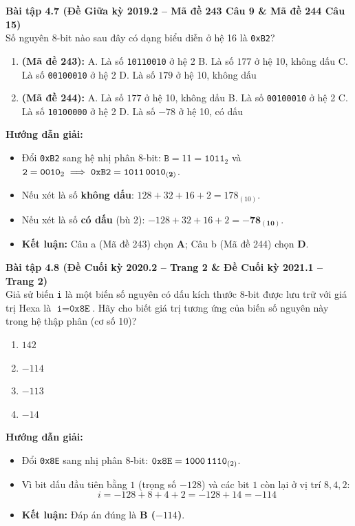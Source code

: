 \textbf{Bài tập 4.7 (Đề Giữa kỳ 2019.2 -- Mã đề 243 Câu 9 \& Mã đề 244 Câu 15)}\\
Số nguyên 8-bit nào sau đây có dạng biểu diễn ở hệ 16 là \texttt{0xB2}?
\begin{enumerate}[label=\alph*)]
    \item \textbf{(Mã đề 243):} A. Là số \texttt{10110010} ở hệ 2 \quad B. Là số $177$ ở hệ 10, không dấu \quad C. Là số \texttt{00100010} ở hệ 2 \quad D. Là số $179$ ở hệ 10, không dấu
    \item \textbf{(Mã đề 244):} A. Là số $177$ ở hệ 10, không dấu \quad B. Là số \texttt{00100010} ở hệ 2 \quad C. Là số \texttt{10100000} ở hệ 2 \quad D. Là số $-78$ ở hệ 10, có dấu
\end{enumerate}
\textbf{Hướng dẫn giải:}
\begin{itemize}
    \item Đổi \texttt{0xB2} sang hệ nhị phân 8-bit: $\texttt{B} = 11 = \texttt{1011}_2$ và $\texttt{2} = \texttt{0010}_2 \implies \texttt{0xB2} = \mathbf{\texttt{1011\,0010}_{(2)}}$.
    \item Nếu xét là số \textbf{không dấu}: $128 + 32 + 16 + 2 = 178_{(10)}$.
    \item Nếu xét là số \textbf{có dấu} (bù 2): $-128 + 32 + 16 + 2 = \mathbf{-78_{(10)}}$.
    \item \textbf{Kết luận:} Câu a (Mã đề 243) chọn \textbf{A}; Câu b (Mã đề 244) chọn \textbf{D}.
\end{itemize}

\textbf{Bài tập 4.8 (Đề Cuối kỳ 2020.2 -- Trang 2 \& Đề Cuối kỳ 2021.1 -- Trang 2)}\\
Giả sử biến \texttt{i} là một biến số nguyên có dấu kích thước 8-bit được lưu trữ với giá trị Hexa là $\texttt{i} = \texttt{0x8E}$. Hãy cho biết giá trị tương ứng của biến số nguyên này trong hệ thập phân (cơ số 10)?
\begin{enumerate}[label=\Alph*.]
    \item $142$
    \item $-114$
    \item $-113$
    \item $-14$
\end{enumerate}
\textbf{Hướng dẫn giải:}
\begin{itemize}
    \item Đổi \texttt{0x8E} sang nhị phân 8-bit: $\texttt{0x8E} = \texttt{1000\,1110}_{(2)}$.
    \item Vì bit dấu đầu tiên bằng $1$ (trọng số $-128$) và các bit $1$ còn lại ở vị trí $8, 4, 2$:
    $$i = -128 + 8 + 4 + 2 = -128 + 14 = -114$$
    \item \textbf{Kết luận:} Đáp án đúng là \textbf{B ($-114$)}.
\end{itemize}

